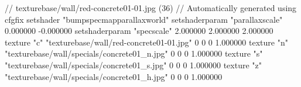 // texturebase/wall/red-concrete01-01.jpg (36)
// Automatically generated using cfgfix
setshader "bumpspecmapparallaxworld"
setshaderparam "parallaxscale" 0.000000 -0.000000
setshaderparam "specscale" 2.000000 2.000000 2.000000
texture "c" "texturebase/wall/red-concrete01-01.jpg" 0 0 0 1.000000
texture "n" "texturebase/wall/specials/concrete01_n.jpg" 0 0 0 1.000000
texture "s" "texturebase/wall/specials/concrete01_s.jpg" 0 0 0 1.000000
texture "z" "texturebase/wall/specials/concrete01_h.jpg" 0 0 0 1.000000
